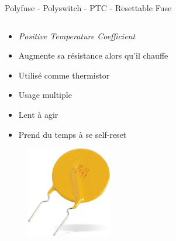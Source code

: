 \begin{frame}{Polyfuse - Polyswitch - PTC - Resettable Fuse}
    \begin{columns}
        \begin{column}{0.5\textwidth}
            \begin{itemize}
                \item \textit{Positive Temperature Coefficient}
                \item Augmente sa résistance alors qu'il chauffe
                \item Utilisé comme thermistor
                \bigskip
                \item Usage multiple
                \item Lent à agir
                \item Prend du temps à se self-reset
            \end{itemize}
            \vspace{12pt}
            \begin{figure}
                \centering
                \includegraphics[width=0.33\textwidth]{pictures/polyfuse.png}
            \end{figure}
        \end{column}


\end{columns}
\end{frame}
